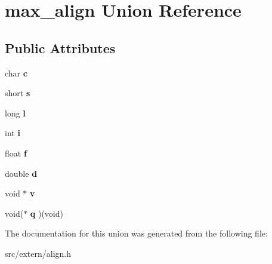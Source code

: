 \hypertarget{unionmax__align}{\section{max\+\_\+align Union Reference}
\label{unionmax__align}
}
\subsection*{Public Attributes}
\begin{DoxyCompactItemize}
\item 
\hypertarget{unionmax__align_ae0f6c483820acb32266a5a03449874a1}{char {\bfseries c}}\label{unionmax__align_ae0f6c483820acb32266a5a03449874a1}

\item 
\hypertarget{unionmax__align_a786335ebeeca204d9abb1570f1fd9258}{short {\bfseries s}}\label{unionmax__align_a786335ebeeca204d9abb1570f1fd9258}

\item 
\hypertarget{unionmax__align_aec3ccee73d705da2b2fb4987a0cfb88c}{long {\bfseries l}}\label{unionmax__align_aec3ccee73d705da2b2fb4987a0cfb88c}

\item 
\hypertarget{unionmax__align_ae435683bc3acb9d7a5cb8a154e274ed0}{int {\bfseries i}}\label{unionmax__align_ae435683bc3acb9d7a5cb8a154e274ed0}

\item 
\hypertarget{unionmax__align_aef79c8eefe43f54bb746cb66094f9e69}{float {\bfseries f}}\label{unionmax__align_aef79c8eefe43f54bb746cb66094f9e69}

\item 
\hypertarget{unionmax__align_a348f5ea41f081f6fd243ffa6dd1bd820}{double {\bfseries d}}\label{unionmax__align_a348f5ea41f081f6fd243ffa6dd1bd820}

\item 
\hypertarget{unionmax__align_af33cdc78318cd53fd47d8f5331446d30}{void $\ast$ {\bfseries v}}\label{unionmax__align_af33cdc78318cd53fd47d8f5331446d30}

\item 
\hypertarget{unionmax__align_a7ed5d9e65c78c7b5acb2e064cf98e03a}{void($\ast$ {\bfseries q} )(void)}\label{unionmax__align_a7ed5d9e65c78c7b5acb2e064cf98e03a}

\end{DoxyCompactItemize}


The documentation for this union was generated from the following file\+:\begin{DoxyCompactItemize}
\item 
src/extern/align.\+h\end{DoxyCompactItemize}
